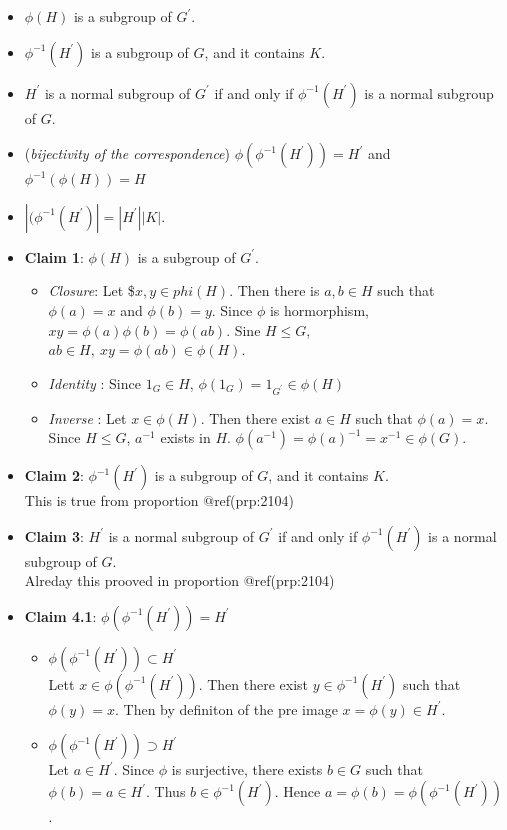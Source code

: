 \documentclass[
]{book}
\providecommand{\tightlist}{%
  \setlength{\itemsep}{0pt}\setlength{\parskip}{0pt}}
\begin{document}
\begin{itemize}
\item
  \(\phi(H)\) is a subgroup of \(G^\prime\).
\item
  \(\phi^{-1}(H^\prime)\) is a subgroup of \(G\), and it contains \(K\).
\item
  \(H^\prime\) is a normal subgroup of \(G^\prime\) if and only if
  \(\phi^{-1}(H^\prime)\) is a normal subgroup of \(G\).
\item
  (\emph{bijectivity of the correspondence})
  \(\phi(\phi^{-1}(H^\prime)) =H^\prime\) and \(\phi^{-1}(\phi(H))=H\)
\item
  \(|(\phi^{-1} (H^\prime)| = |H^\prime||K|\).
\item
  \textbf{Claim 1}: \(\phi(H)\) is a subgroup of \(G^\prime\).\\

  \begin{itemize}
  \tightlist
  \item
    \emph{Closure}: Let \$\(x,y\in phi(H)\). Then there is \(a,b\in H\)
    such that \(\phi(a)=x\) and \(\phi(b)=y\). Since \(\phi\) is
    hormorphism, \(xy=\phi(a)\phi(b)=\phi(ab)\). Sine \(H\leq G\),
    \(ab\in H,~ xy=\phi(ab)\in \phi(H)\).
  \item
    \emph{Identity} : Since \(1_G\in H\),
    \(\phi(1_G)=1_{G^\prime}\in \phi(H)\)
  \item
    \emph{Inverse} : Let \(x\in \phi(H)\). Then there exist \(a\in H\)
    such that \(\phi(a)=x\). Since \(H\leq G\), \(a^{-1}\) exists in
    \(H\). \(\phi(a^{-1})=\phi(a)^{-1}=x^{-1}\in \phi(G)\).
  \end{itemize}
\item
  \textbf{Claim 2}: \(\phi^{-1}(H^\prime)\) is a subgroup of \(G\), and
  it contains \(K\).\\
  This is true from proportion @ref(prp:2104)
\item
  \textbf{Claim 3}: \(H^\prime\) is a normal subgroup of \(G^\prime\) if
  and only if \(\phi^{-1}(H^\prime)\) is a normal subgroup of \(G\).\\
  Alreday this prooved in proportion @ref(prp:2104)
\item
  \textbf{Claim 4.1}: \(\phi(\phi^{-1}(H^\prime))=H^\prime\)

  \begin{itemize}
  \item
    \(\phi(\phi^{-1}(H^\prime))\subset H^\prime\)\\
    Lett \(x\in \phi(\phi^{-1}(H^\prime))\). Then there exist
    \(y\in\phi^{-1}(H^\prime)\) such that \(\phi(y)=x\). Then by
    definiton of the pre image \(x=\phi(y)\in H^\prime\).
  \item
    \(\phi(\phi^{-1}(H^\prime))\supset H^\prime\)\\
    Let \(a\in H^\prime\). Since \(\phi\) is surjective, there exists
    \(b\in G\) such that \(\phi(b)=a\in H^\prime\). Thus
    \(b\in \phi^{-1}(H^\prime)\). Hence
    \(a=\phi(b)=\phi(\phi^{-1}(H^\prime))\).
  \end{itemize}
\end{itemize}
\end{document}

